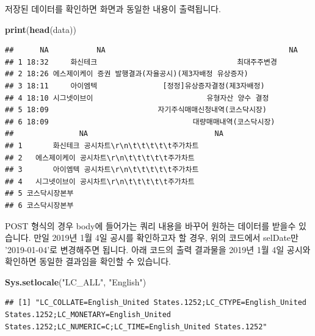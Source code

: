 \documentclass[]{book}
\newenvironment{Shaded}{\begin{snugshade}}{\end{snugshade}}
\newcommand{\KeywordTok}[1]{\textcolor[rgb]{0.13,0.29,0.53}{\textbf{#1}}}
\newcommand{\NormalTok}[1]{#1}
\newcommand{\StringTok}[1]{\textcolor[rgb]{0.31,0.60,0.02}{#1}}
\begin{document}
저장된 데이터를 확인하면 화면과 동일한 내용이 출력됩니다.

\begin{Shaded}
\begin{Highlighting}[]
\KeywordTok{print}\NormalTok{(}\KeywordTok{head}\NormalTok{(data))}
\end{Highlighting}
\end{Shaded}

\begin{verbatim}
##      NA           NA                                          NA
## 1 18:32     화신테크                                최대주주변경
## 2 18:26 에스제이케이 증권 발행결과(자율공시)(제3자배정 유상증자)
## 3 18:11     아이엠텍               [정정]유상증자결정(제3자배정)
## 4 18:10 시그넷이브이                          유형자산 양수 결정
## 5 18:09                         자기주식매매신청내역(코스닥시장)
## 6 18:09                                 대량매매내역(코스닥시장)
##               NA                             NA
## 1       화신테크 공시차트\r\n\t\t\t\t\t주가차트
## 2   에스제이케이 공시차트\r\n\t\t\t\t\t주가차트
## 3       아이엠텍 공시차트\r\n\t\t\t\t\t주가차트
## 4   시그넷이브이 공시차트\r\n\t\t\t\t\t주가차트
## 5 코스닥시장본부                               
## 6 코스닥시장본부
\end{verbatim}

POST 형식의 경우 body에 들어가는 쿼리 내용을 바꾸어 원하는 데이터를 받을수 있습니다. 만일 2019년 1월 4일 공시를 확인하고자 할 경우, 위의 코드에서 selDate만 '2019-01-04'로 변경해주면 됩니다. 아래 코드의 출력 결과물을 2019년 1월 4일 공시와 확인하면 동일한 결과임을 확인할 수 있습니다.

\begin{Shaded}
\begin{Highlighting}[]
\KeywordTok{Sys.setlocale}\NormalTok{(}\StringTok{"LC_ALL"}\NormalTok{, }\StringTok{"English"}\NormalTok{)}
\end{Highlighting}
\end{Shaded}

\begin{verbatim}
## [1] "LC_COLLATE=English_United States.1252;LC_CTYPE=English_United States.1252;LC_MONETARY=English_United States.1252;LC_NUMERIC=C;LC_TIME=English_United States.1252"
\end{verbatim}
\end{document}
